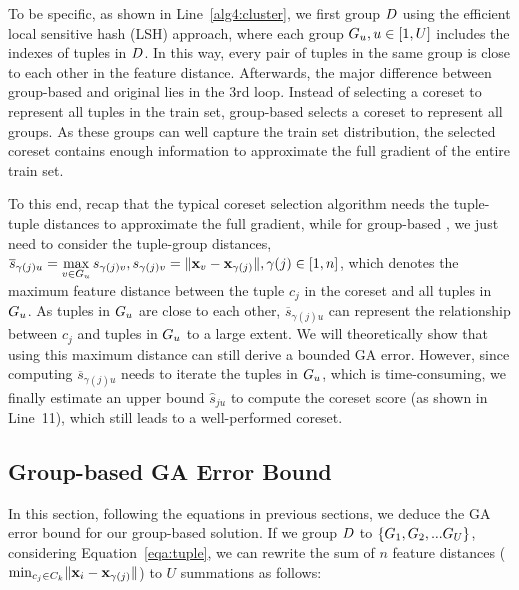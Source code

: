 To be specific, as shown in Line~\ref{alg4:cluster}, we first group $D$   using the efficient local sensitive hash (LSH) approach, where each group $G_u, u\in[1, U]$ includes the indexes of tuples in $D$. In this way, every pair of tuples in the same group is close to each other in the feature distance.
%
 Afterwards, the major difference between group-based \ours and original \ours lies in the 3rd loop. Instead of  selecting a coreset to represent all tuples in the train set, group-based \ours selects a coreset to represent all groups. As these groups can well capture the train set distribution, the selected coreset contains enough information to approximate the full gradient of the entire train set. 
 
 To this end, recap that the typical coreset selection algorithm needs the tuple-tuple distances to approximate the full gradient, while for group-based \ours, we just need to consider the tuple-group distances, \ie  
$\overline{s}_{\gamma(j)u} = \max\limits_{v \in G_u} s_{\gamma(j)v}, s_{\gamma(j)v} = \lVert\mathbf{x}_v - \mathbf{x}_{\gamma(j)}\rVert, \gamma(j)\in[1, n]$, which denotes the maximum feature distance between the tuple $c_j$ in the coreset and all tuples in $G_u$. As tuples in $G_u$ are close to each other, $\overline{s}_{\gamma(j)u}$ can represent the relationship between $c_j$ and tuples in $G_u$ to a large extent.
%
We will theoretically show that using this maximum distance can still derive a bounded GA error. 
However, since computing $\overline{s}_{\gamma(j)u}$ needs to iterate the tuples in $G_u$, which is time-consuming, we finally estimate an upper bound $\hat{s}_{ju}$ to compute the coreset score (as shown in Line~11), which still leads to a well-performed coreset. 
%






\subsection{Group-based GA Error Bound}
\label{group-ea}

In this section, following the equations in previous sections, we deduce the GA error bound for our group-based solution. 
%
If we group $D$ to $\{ G_1 , G_2, ...G_U\}$, considering Equation~\ref{eqa:tuple}, we  can rewrite the sum of $n$ feature distances (\ie $\min_{c_j\in C_k}\lVert\mathbf{x}_i - \mathbf{x}_{\gamma(j)}\rVert$) to $U$ summations as follows:

